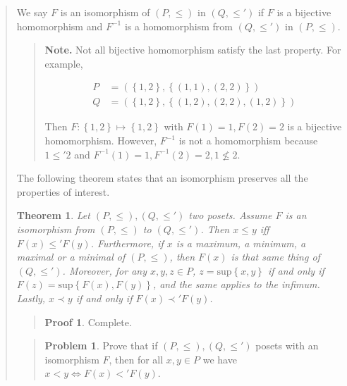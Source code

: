 \documentclass[a4paper, 12pt]{article}
\newtheorem{theorem}{Theorem}
\theoremstyle{definition}
\newtheorem{problem}{Problem}
\theoremstyle{definition}
\theoremstyle{definition}
\newtheorem{pro}{Proof}
\begin{document}
\begin{quote}
We say $F$ is an isomorphism of $(P, \leq) $ in $(Q, \leq') $ if $F$ is a
bijective homomorphism and $F^{-1}$ is a homomorphism from $(Q, \leq') $ in
$(P, \leq) $. 


\small
\begin{quote}

\textbf{Note.} Not all bijective homomorphism satisfy the last property. For
example, 

\begin{align*}
    P &= \left( \left\{ 1, 2 \right\}, \left\{ (1, 1), (2, 2) \right\}\right) \\
    Q &= \left( \left\{ 1, 2 \right\}, \left\{ (1, 2),(2, 2), (1, 2)
\right\}   \right) 
\end{align*}

Then $F : \left\{ 1, 2 \right\} \mapsto \left\{ 1, 2
\right\} $ with $F(1) = 1, F(2) = 2$ is a bijective homomorphism. However,
$F^{-1}$ is not a homomorphism because $1 \leq' 2$ and $F^{-1}(1) = 1, F^{-1}(2)
= 2, 1 \not\leq 2$.

\end{quote}
\normalsize


The following theorem states that an isomorphism preserves all the properties of
interest.

\begin{theorem}
    Let $(P, \leq), (Q, \leq') $ two posets. Assume $F$ is an isomorphism from
    $(P, \leq) $ to $(Q, \leq') $. Then $x \leq y$ iff $F(x) \leq' F(y)$.
    Furthermore, if $x$ is a maximum, a minimum, a maximal or a minimal of $(P,
    \leq) $, then $F(x)$ is that same thing of $(Q, \leq') $. Moreover, for any
    $x, y, z \in P$, $z = \text{sup}\left\{ x, y \right\} $ if and only if $F(z)
    = \text{sup}\left\{ F(x), F(y) \right\} $, and the same applies to the
    infimum. Lastly, $x \prec y$ if and only if $F(x) \prec' F(y)$.
\end{theorem}


\small
\begin{quote}

\begin{pro}
    Complete.
\end{pro}

\end{quote}
\normalsize


\small
\begin{quote}

\begin{problem}
    Prove that if $(P, \leq) , (Q, \leq') $ posets with an isomorphism $F$, then
    for all $x, y \in P$ we have $x < y \iff F(x) <' F(y)$.
\end{problem}


\end{quote}
\end{quote}
\end{document}
